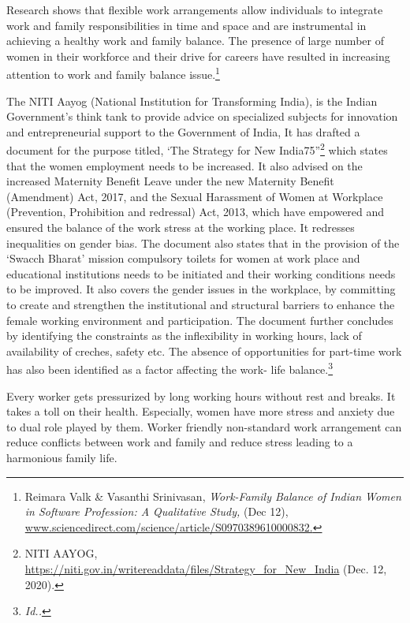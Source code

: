 \begin{multicols}{2}
\noi
Research shows that flexible work arrangements allow individuals to integrate work and
family responsibilities in time and space and are instrumental in achieving a healthy work and
family balance. The presence of large number of women in their workforce and their drive for
careers have resulted in increasing attention to work and family balance issue.\footnote{Reimara Valk \& Vasanthi Srinivasan, \textit{Work-Family Balance of Indian Women in Software Profession: A
Qualitative Study,} (Dec 12), \url{www.sciencedirect.com/science/article/S0970389610000832.}}

\newpage


\noi
The NITI Aayog (National Institution for Transforming India), is the Indian Government’s
think tank to provide advice on specialized subjects for innovation and entrepreneurial
support to the Government of India, It has drafted a document for the purpose titled, ‘The
Strategy for New India\@75”\footnote{NITI AAYOG, \url{https://niti.gov.in/writereaddata/files/Strategy_for_New_India} (Dec. 12, 2020).} which states that the women employment needs to be
increased. It also advised on the increased Maternity Benefit Leave under the new Maternity
Benefit (Amendment) Act, 2017, and the Sexual Harassment of Women at Workplace
(Prevention, Prohibition and redressal) Act, 2013, which have empowered and ensured the
balance of the work stress at the working place. It redresses inequalities on gender bias. The document also states that in the provision of the ‘Swacch Bharat’ mission compulsory toilets
for women at work place and educational institutions needs to be initiated and their working
conditions needs to be improved. It also covers the gender issues in the workplace, by
committing to create and strengthen the institutional and structural barriers to enhance the
female working environment and participation. The document further concludes by
identifying the constraints as the inflexibility in working hours, lack of availability of
creches, safety etc. The absence of opportunities for part-time work has also been identified
as a factor affecting the work- life balance.\footnote{\textit{Id..}}


\noi
Every worker gets pressurized by long working hours without rest and breaks. It takes a toll
on their health. Especially, women have more stress and anxiety due to dual role played by
them. Worker friendly non-standard work arrangement can reduce conflicts between work
and family and reduce stress leading to a harmonious family life.


\end{multicols}
